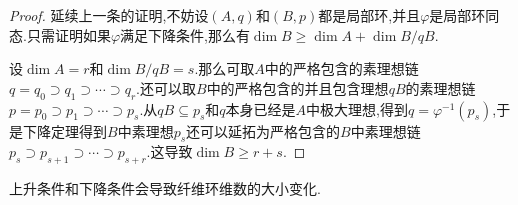 \begin{enumerate}
\begin{proof}
    	延续上一条的证明,不妨设$(A,q)$和$(B,p)$都是局部环,并且$\varphi$是局部环同态.只需证明如果$\varphi$满足下降条件,那么有$\dim B\ge\dim A+\dim B/qB$.
    	
    	\qquad
    	
    	设$\dim A=r$和$\dim B/qB=s$.那么可取$A$中的严格包含的素理想链$q=q_0\supset q_1\supset\cdots\supset q_r$.还可以取$B$中的严格包含的并且包含理想$qB$的素理想链$p=p_0\supset p_1\supset\cdots\supset p_s$.从$qB\subseteq p_s$和$q$本身已经是$A$中极大理想,得到$q=\varphi^{-1}(p_s)$,于是下降定理得到$B$中素理想$p_s$还可以延拓为严格包含的$B$中素理想链$p_s\supset p_{s+1}\supset\cdots\supset p_{s+r}$.这导致$\dim B\ge r+s$.
    \end{proof}
\end{enumerate}

上升条件和下降条件会导致纤维环维数的大小变化.
